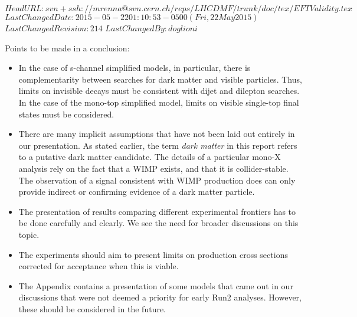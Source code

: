 \svnidlong
{$HeadURL: svn+ssh://mrenna@svn.cern.ch/reps/LHCDMF/trunk/doc/tex/EFTValidity.tex $}
{$LastChangedDate: 2015-05-22 01:10:53 -0500 (Fri, 22 May 2015) $}
{$LastChangedRevision: 214 $}
{$LastChangedBy: doglioni $}

Points to be made in a conclusion:
\begin{itemize}

\item In the case of s-channel simplified models, in particular, there is complementarity between searches for dark matter and visible particles.   Thus, limits on invisible decays must be consistent with dijet and dilepton searches.  In the case of the mono-top simplified model, limits on visible single-top final states must be considered.

\item There are many implicit assumptions that have not been laid out entirely in our presentation.   As stated earlier, the term \textit{dark matter} in this report refers to a putative dark matter candidate.
  The details of a particular mono-X analysis rely on the fact that a
  WIMP exists, and that it is collider-stable.   The observation of a
  signal consistent with WIMP production does can only provide indirect or confirming evidence of a dark matter particle.

\item The presentation of results comparing different experimental frontiers has to be done carefully and clearly.  We see the need for broader discussions on this topic.

\item The experiments should aim to present limits on production cross sections corrected for acceptance when this is viable.  

\item The Appendix contains a presentation of some models that came out in our discussions that were not deemed a priority for early Run2 analyses.  However, these should be considered in the future.

\end{itemize}
